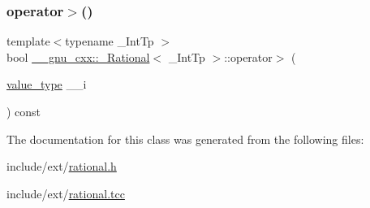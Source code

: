 \subsubsection{\texorpdfstring{operator$>$()}{operator>()}}
{\footnotesize\ttfamily template$<$typename \+\_\+\+Int\+Tp $>$ \\
bool \hyperlink{class____gnu__cxx_1_1__Rational}{\+\_\+\+\_\+gnu\+\_\+cxx\+::\+\_\+\+Rational}$<$ \+\_\+\+Int\+Tp $>$\+::operator$>$ (\begin{DoxyParamCaption}\item[{\hyperlink{class____gnu__cxx_1_1__Rational_a7987be70fc59d0d980621fd65828b74a}{value\+\_\+type}}]{\+\_\+\+\_\+i }\end{DoxyParamCaption}) const}



The documentation for this class was generated from the following files\+:\begin{DoxyCompactItemize}
\item 
include/ext/\hyperlink{rational_8h}{rational.\+h}\item 
include/ext/\hyperlink{rational_8tcc}{rational.\+tcc}\end{DoxyCompactItemize}
